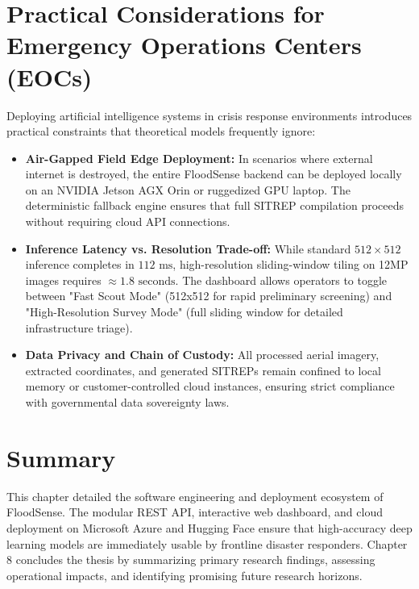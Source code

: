 \section{Practical Considerations for Emergency Operations Centers (EOCs)}
Deploying artificial intelligence systems in crisis response environments introduces practical constraints that theoretical models frequently ignore:
\begin{itemize}
    \item \textbf{Air-Gapped Field Edge Deployment:} In scenarios where external internet is destroyed, the entire FloodSense backend can be deployed locally on an NVIDIA Jetson AGX Orin or ruggedized GPU laptop. The deterministic fallback engine ensures that full SITREP compilation proceeds without requiring cloud API connections.
    \item \textbf{Inference Latency vs. Resolution Trade-off:} While standard $512 \times 512$ inference completes in $112\text{ ms}$, high-resolution sliding-window tiling on 12MP images requires $\approx 1.8\text{ seconds}$. The dashboard allows operators to toggle between "Fast Scout Mode" (512x512 for rapid preliminary screening) and "High-Resolution Survey Mode" (full sliding window for detailed infrastructure triage).
    \item \textbf{Data Privacy and Chain of Custody:} All processed aerial imagery, extracted coordinates, and generated SITREPs remain confined to local memory or customer-controlled cloud instances, ensuring strict compliance with governmental data sovereignty laws.
\end{itemize}

\section{Summary}
This chapter detailed the software engineering and deployment ecosystem of FloodSense. The modular REST API, interactive web dashboard, and cloud deployment on Microsoft Azure and Hugging Face ensure that high-accuracy deep learning models are immediately usable by frontline disaster responders. Chapter 8 concludes the thesis by summarizing primary research findings, assessing operational impacts, and identifying promising future research horizons.
